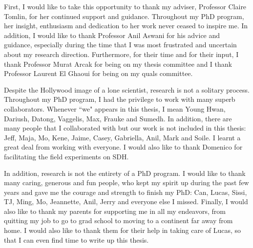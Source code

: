 \documentclass[12pt, oneside, final]{lib/ucthesis}
\begin{document}
\tableofcontents

\begin{acknowledgements}
\thispagestyle{plain}

First, I would like to take this opportunity to thank my adviser, Professor Claire Tomlin, for her continued support and guidance. Throughout my PhD program, her insight, enthusiasm and dedication to her work never ceased to inspire me.
In addition, I would like to thank Professor Anil Aswani for his advice and guidance, especially during the time that I was most frustrated and uncertain about my research direction.
Furthermore, for their time and for their input, I thank Professor Murat Arcak for being on my thesis committee and I thank Professor Laurent El Ghaoui for being on my quals committee.

Despite the Hollywood image of a lone scientist, research is not a solitary process. 
Throughout my PhD program, I had the privilege to work with many superb collaborators. Whenever ``we" appears in this thesis, I mean Young Hwan, Dariush, Datong, Vaggelis, Max, Frauke and Sumedh. 
In addition, there are many people that I collaborated with but our work is not included in this thesis: Jeff, Maja, Mo, Kene, Jaime, Casey, Gabriella, Anil, Mark and Soile. 
I learnt a great deal from working with everyone.
I would also like to thank Domenico for facilitating the field experiments on SDH.

In addition, research is not the entirety of a PhD program. I would like to thank many caring, generous and fun people, who kept my spirit up during the past few years and gave me the courage and strength to finish my PhD: Can, Lucas, Sissi, TJ, Ming, Mo, Jeannette, Anil, Jerry and everyone else I missed.
Finally, I would also like to thank my parents for supporting me in all my endeavors, from quitting my job to go to grad school to moving to a continent far away from home. I would also like to thank them for their help in taking care of Lucas, so that I can even find time to write up this thesis.


\end{acknowledgements}



\end{document}
